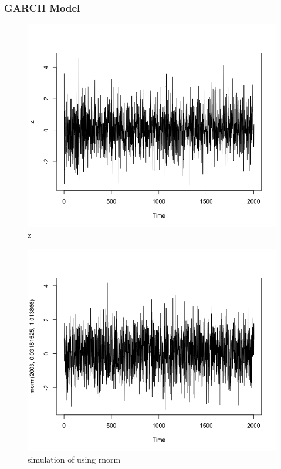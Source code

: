 \documentclass[a4paper,10pt]{article}
\begin{document}
\subsubsection{GARCH Model}

\begin{figure}[H]
\centering
\caption{z}
\includegraphics[scale=.40]{z.png}
\end{figure}

\begin{figure}[H]
\centering
\caption{simulation of using rnorm}
\includegraphics[scale=.40]{rnorm.png}
\end{figure}
\end{document}
